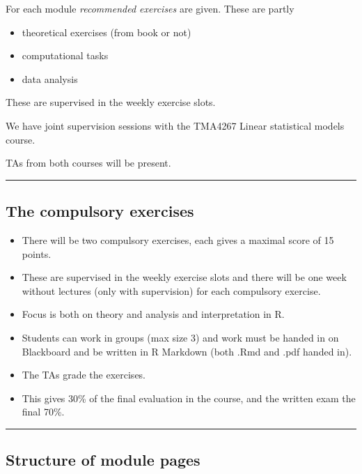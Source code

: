 \documentclass[]{article}
\providecommand{\tightlist}{%
  \setlength{\itemsep}{0pt}\setlength{\parskip}{0pt}}
\begin{document}
For each module \emph{recommended exercises} are given. These are partly

\begin{itemize}
\tightlist
\item
  theoretical exercises (from book or not)
\item
  computational tasks
\item
  data analysis
\end{itemize}

These are supervised in the weekly exercise slots.

We have joint supervision sessions with the TMA4267 Linear statistical
models course.

TAs from both courses will be present.

\begin{center}\rule{0.5\linewidth}{\linethickness}\end{center}

\hypertarget{the-compulsory-exercises}{%
\subsection{The compulsory exercises}\label{the-compulsory-exercises}}

\begin{itemize}
\tightlist
\item
  There will be two compulsory exercises, each gives a maximal score of
  15 points.
\item
  These are supervised in the weekly exercise slots and there will be
  one week without lectures (only with supervision) for each compulsory
  exercise.
\item
  Focus is both on theory and analysis and interpretation in R.
\item
  Students can work in groups (max size 3) and work must be handed in on
  Blackboard and be written in R Markdown (both .Rmd and .pdf handed
  in).
\item
  The TAs grade the exercises.
\item
  This gives 30\% of the final evaluation in the course, and the written
  exam the final 70\%.
\end{itemize}

\begin{center}\rule{0.5\linewidth}{\linethickness}\end{center}

\hypertarget{structure-of-module-pages}{%
\subsection{Structure of module pages}\label{structure-of-module-pages}}
\end{document}
